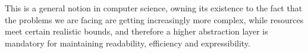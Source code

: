 \documentclass[sigplan,review,anonymous]{acmart}
\begin{document}
This is a general notion in computer science, owning its existence to the fact
that the problems we are facing are getting increasingly more complex, while
resources meet certain realistic bounds, and therefore a higher abstraction
layer is mandatory for maintaining readability, efficiency and expressibility.



\end{document}
